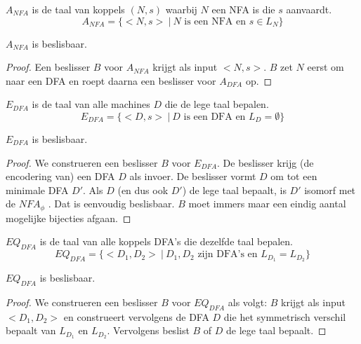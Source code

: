\documentclass[main.tex]{subfiles}
\begin{document}
\begin{de}
  \label{de:a-nfa}
  $A_{NFA}$ is de taal van koppels $(N,s)$ waarbij $N$ een NFA is die $s$ aanvaardt.
  \[ A_{NFA} = \{ <N,s> \ |\ N \text{ is een NFA en } s \in L_{N} \} \]
\end{de}

\begin{st}
  \label{st-a-nfa-besl}
  $A_{NFA}$ is beslisbaar.

  \begin{proof}
    Een beslisser $B$ voor $A_{NFA}$ krijgt als input $<N,s>$.
    $B$ zet $N$ eerst om naar een DFA en roept daarna een beslisser voor $A_{DFA}$ op.
  \end{proof}
\end{st}

\begin{de}
  \label{de:e-dfa}
  $E_{DFA}$ is de taal van alle machines $D$ die de lege taal bepalen.
  \[ E_{DFA} = \{ <D,s>\ |\ D \text{ is een DFA en } L_{D} = \emptyset \} \]
\end{de}

\begin{st}
  \label{st:e-dfa-besl}
  $E_{DFA}$ is beslisbaar.

  \begin{proof}
    We construeren een beslisser $B$ voor $E_{DFA}$.
    De beslisser krijg (de encodering van) een DFA $D$ als invoer.
    De beslisser vormt $D$ om tot een minimale DFA $D'$.
    Als $D$ (en dus ook $D'$) de lege taal bepaalt, is $D'$ isomorf met de $NFA_{\phi}$ .
    Dat is eenvoudig beslisbaar. $B$ moet immers maar een eindig aantal mogelijke bijecties afgaan.
  \end{proof}
\end{st}

\begin{de}
  \label{de:eq-dfa}
  $EQ_{DFA}$ is de taal van alle koppels DFA's die dezelfde taal bepalen.
  \[ EQ_{DFA} = \{ <D_{1},D_{2}> \ |\ D_{1},D_{2} \text{ zijn DFA's en } L_{D_{1}} = L_{D_{2}} \} \]  
\end{de}

\begin{st}
  \label{st:eq-dfa-besl}
  $EQ_{DFA}$ is beslisbaar.

  \begin{proof}
    We construeren een beslisser $B$ voor $EQ_{DFA}$ als volgt:
    $B$ krijgt als input $<D_{1},D_{2}>$ en construeert vervolgens de DFA $D$ die het symmetrisch verschil bepaalt van $L_{D_{1}}$ en $L_{D_{2}}$.
    Vervolgens beslist $B$ of $D$ de lege taal bepaalt.
  \end{proof}
\end{st}
\end{document}
